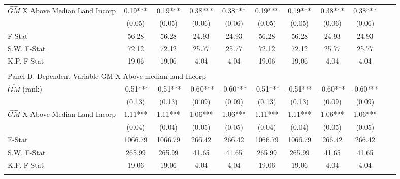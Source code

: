 \begin{table}[htbp]
\begin{threeparttable}
\begin{tabular}{l*{10}{c}}
\addlinespace
$\hat{GM}$ X Above Median Land Incorp&       0.19***&       0.19***&       0.38***&       0.38***&       0.19***&       0.19***&       0.38***&       0.38***\\
                &     (0.05)   &     (0.05)   &     (0.06)   &     (0.06)   &     (0.05)   &     (0.05)   &     (0.06)   &     (0.06)   \\
\midrule
F-Stat          &      56.28   &      56.28   &      24.93   &      24.93   &      56.28   &      56.28   &      24.93   &      24.93   \\
S.W. F-Stat     &      72.12   &      72.12   &      25.77   &      25.77   &      72.12   &      72.12   &      25.77   &      25.77   \\
K.P. F-Stat     &      19.06   &      19.06   &       4.04   &       4.04   &      19.06   &      19.06   &       4.04   &       4.04   \\
\cmidrule[\heavyrulewidth](lr){1-9} \\ \cmidrule[\heavyrulewidth](lr){1-9}
\multicolumn{8}{l}{Panel D: Dependent Variable GM X Above median land Incorp}\\
\cmidrule(lr){1-9}
$\hat{GM}$ (rank)&      -0.51***&      -0.51***&      -0.60***&      -0.60***&      -0.51***&      -0.51***&      -0.60***&      -0.60***\\
                &     (0.13)   &     (0.13)   &     (0.09)   &     (0.09)   &     (0.13)   &     (0.13)   &     (0.09)   &     (0.09)   \\
\addlinespace
$\hat{GM}$ X Above Median Land Incorp&       1.11***&       1.11***&       1.06***&       1.06***&       1.11***&       1.11***&       1.06***&       1.06***\\
                &     (0.04)   &     (0.04)   &     (0.05)   &     (0.05)   &     (0.04)   &     (0.04)   &     (0.05)   &     (0.05)   \\
\midrule
F-Stat          &    1066.79   &    1066.79   &     266.42   &     266.42   &    1066.79   &    1066.79   &     266.42   &     266.42   \\
S.W. F-Stat     &     265.99   &     265.99   &      41.65   &      41.65   &     265.99   &     265.99   &      41.65   &      41.65   \\
K.P. F-Stat     &      19.06   &      19.06   &       4.04   &       4.04   &      19.06   &      19.06   &       4.04   &       4.04   \\
\cmidrule[\heavyrulewidth](lr){1-9} \\ \cmidrule[\heavyrulewidth](lr){1-9}

\end{tabular}
\end{threeparttable}
\end{table}

